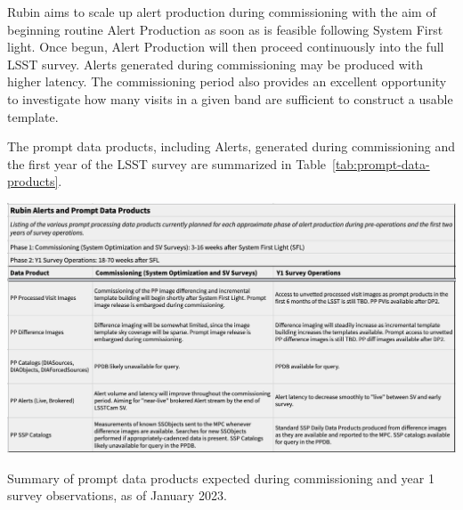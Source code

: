 Rubin aims to scale up alert production during commissioning with the aim of beginning routine Alert Production as soon as is feasible following System First light.
Once begun, Alert Production will then proceed continuously into the full LSST survey.
Alerts generated during commissioning may be produced with higher latency.
The commissioning period also provides an excellent opportunity to investigate how many visits in a given band are sufficient to construct a usable template.

The prompt data products, including Alerts, generated during commissioning and the first year of the LSST survey are summarized in Table~\ref{tab:prompt-data-products}.

\begin{table}[ht]
\centering
\includegraphics[width=0.9\linewidth]{figures/Prompt-products}
\caption{Summary of prompt data products expected during commissioning and year 1 survey observations, as of January 2023.}
\label{tab:prompt-data-products}
\end{table}
